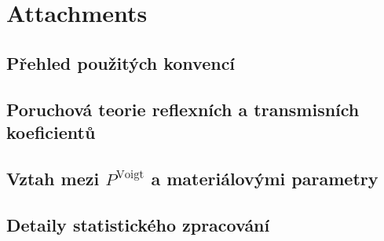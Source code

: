 \documentclass[12pt,a4paper]{report}
\newcommand{\PMLD}{P^\textrm{Voigt}}
\begin{document}




\tableofcontents













\printbibliography
\label{bibliography}



\appendix
\chapter{Attachments}

\section{Přehled použitých konvencí}\label{k:dodatek konvence}

\section{Poruchová teorie reflexních a transmisních koeficientů}\label{k:dodatek vypocet}

\section{Vztah mezi $\PMLD$ a materiálovými parametry}



\section{Detaily statistického zpracování}

\openright
\end{document}
